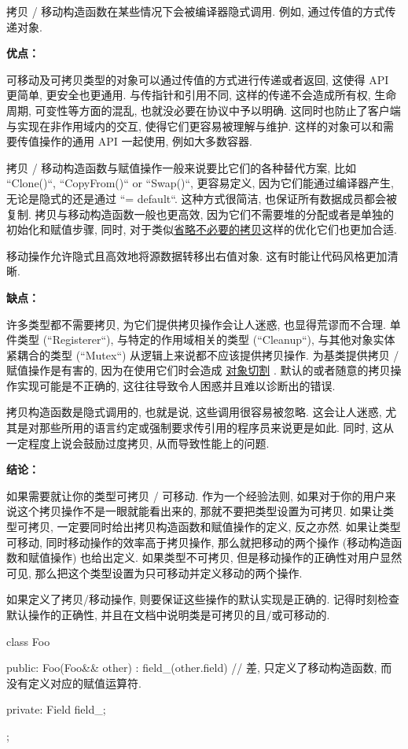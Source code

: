 拷贝 / 移动构造函数在某些情况下会被编译器隐式调用. 例如, 通过传值的方式传递对象.

\textbf{优点：}

可移动及可拷贝类型的对象可以通过传值的方式进行传递或者返回, 这使得 API 更简单, 更安全也更通用. 与传指针和引用不同, 这样的传递不会造成所有权, 生命周期, 可变性等方面的混乱, 也就没必要在协议中予以明确. 这同时也防止了客户端与实现在非作用域内的交互, 使得它们更容易被理解与维护. 这样的对象可以和需要传值操作的通用 API 一起使用, 例如大多数容器.

拷贝 / 移动构造函数与赋值操作一般来说要比它们的各种替代方案, 比如 ``Clone()``, ``CopyFrom()`` or ``Swap()``, 更容易定义, 因为它们能通过编译器产生, 无论是隐式的还是通过 ``= default``. 这种方式很简洁, 也保证所有数据成员都会被复制. 拷贝与移动构造函数一般也更高效, 因为它们不需要堆的分配或者是单独的初始化和赋值步骤, 同时, 对于类似\href{http://en.cppreference.com/w/cpp/language/copy_elision}{省略不必要的拷贝}这样的优化它们也更加合适.

移动操作允许隐式且高效地将源数据转移出右值对象. 这有时能让代码风格更加清晰.

\textbf{缺点：}

许多类型都不需要拷贝, 为它们提供拷贝操作会让人迷惑, 也显得荒谬而不合理. 单件类型 (``Registerer``), 与特定的作用域相关的类型 (``Cleanup``), 与其他对象实体紧耦合的类型 (``Mutex``) 从逻辑上来说都不应该提供拷贝操作. 为基类提供拷贝 / 赋值操作是有害的, 因为在使用它们时会造成 \href{https://en.wikipedia.org/wiki/Object_slicing}{对象切割} . 默认的或者随意的拷贝操作实现可能是不正确的, 这往往导致令人困惑并且难以诊断出的错误.

拷贝构造函数是隐式调用的, 也就是说, 这些调用很容易被忽略. 这会让人迷惑, 尤其是对那些所用的语言约定或强制要求传引用的程序员来说更是如此. 同时, 这从一定程度上说会鼓励过度拷贝, 从而导致性能上的问题.

\textbf{结论：}

如果需要就让你的类型可拷贝 / 可移动. 作为一个经验法则, 如果对于你的用户来说这个拷贝操作不是一眼就能看出来的, 那就不要把类型设置为可拷贝. 如果让类型可拷贝, 一定要同时给出拷贝构造函数和赋值操作的定义, 反之亦然. 如果让类型可移动, 同时移动操作的效率高于拷贝操作, 那么就把移动的两个操作 (移动构造函数和赋值操作) 也给出定义. 如果类型不可拷贝, 但是移动操作的正确性对用户显然可见, 那么把这个类型设置为只可移动并定义移动的两个操作.

如果定义了拷贝/移动操作, 则要保证这些操作的默认实现是正确的. 记得时刻检查默认操作的正确性, 并且在文档中说明类是可拷贝的且/或可移动的.

\begin{cppcode}
  class Foo {
      public:
      Foo(Foo&& other) : field_(other.field) {}
      // 差, 只定义了移动构造函数, 而没有定义对应的赋值运算符.

      private:
      Field field_;
    };
\end{cppcode}


